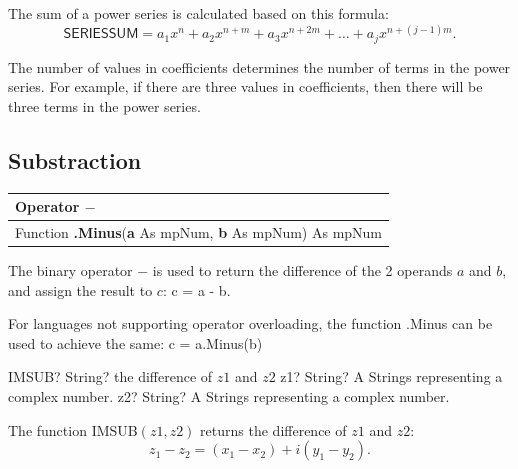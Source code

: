 \vspace{0.3cm}
The sum of a power series is calculated based on this formula:
\begin{equation}
	\textsf{SERIESSUM} = a_1x^n + a_2 x^{n+m} + a_3 x^{n+2m} + \ldots + a_j x^{n+(j-1)m}. 
\end{equation}

The number of values in coefficients determines the number of terms in the power series. For example, if there are three values in coefficients, then there will be three terms in the power series.




\subsection{Substraction}
\begin{tabular}{p{481pt}}
	\toprule
	\textsf{Operator \textbf{$-$}}\index{Multiprecision Functions!$-$} \\
	\midrule
	\textsf{Function \textbf{.Minus}(\textbf{a} As mpNum, \textbf{b} As mpNum) As mpNum}\index{Multiprecision Functions!.Minus} \\
	\bottomrule
\end{tabular}

\vspace{0.3cm}
The binary operator $-$ is used to return the difference of the 2 operands $a$ and $b$, and assign the result to $c$: \textsf{c = a - b}.

For languages not supporting operator overloading, the function \textsf{.Minus} can be used to achieve the same: \textsf{c = a.Minus(b)}




\vspace{0.6cm}
\begin{mpFunctionsExtract}
	\mpWorksheetFunctionTwoNotImplemented
	{IMSUB? String? the difference of $z1$ and $z2$}
	{z1? String? A Strings representing a complex number.}
	{z2? String? A Strings representing a complex number.}
\end{mpFunctionsExtract}


\vspace{0.3cm}
The function \textsf{IMSUB$(z1, z2)$} returns the difference of $z1$ and $z2$: 
\begin{equation}
	z_1 - z_2 =(x_1 - x_2) + i(y_1 - y_2).
\end{equation}




